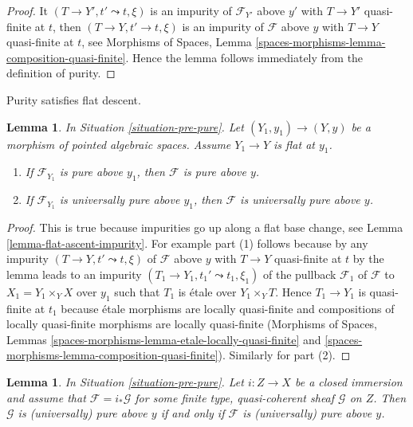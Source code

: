 \documentclass{stacks-project}
\theoremstyle{plain}
\newtheorem{lemma}[subsection]{Lemma}
\theoremstyle{definition}
\theoremstyle{remark}
\numberwithin{equation}{subsection}
\begin{document}
\begin{proof}
It $(T \to Y', t' \leadsto t, \xi)$ is an impurity of
$\mathcal{F}_{Y'}$ above $y'$ with $T \to Y'$ quasi-finite at $t$,
then $(T \to Y, t' \to t, \xi)$ is an impurity of $\mathcal{F}$
above $y$ with $T \to Y$ quasi-finite at $t$, see
Morphisms of Spaces, Lemma
\ref{spaces-morphisms-lemma-composition-quasi-finite}.
Hence the lemma follows immediately from the definition of purity.
\end{proof}

\noindent
Purity satisfies flat descent.

\begin{lemma}
\label{lemma-flat-descend-pure}
In Situation \ref{situation-pre-pure}.
Let $(Y_1, y_1) \to (Y, y)$ be a morphism of pointed algebraic spaces.
Assume $Y_1 \to Y$ is flat at $y_1$.
\begin{enumerate}
\item If $\mathcal{F}_{Y_1}$ is pure above $y_1$,
then $\mathcal{F}$ is pure above $y$.
\item If $\mathcal{F}_{Y_1}$ is universally pure above $y_1$,
then $\mathcal{F}$ is universally pure above $y$.
\end{enumerate}
\end{lemma}

\begin{proof}
This is true because impurities go up along a flat base change, see
Lemma \ref{lemma-flat-ascent-impurity}. For example
part (1) follows because by any impurity $(T \to Y, t' \leadsto t, \xi)$
of $\mathcal{F}$ above $y$ with $T \to Y$ quasi-finite at $t$
by the lemma leads to an impurity
$(T_1 \to Y_1, t_1' \leadsto t_1, \xi_1)$ of the pullback
$\mathcal{F}_1$ of $\mathcal{F}$ to $X_1 = Y_1 \times_Y X$
over $y_1$ such that $T_1$ is \'etale over $Y_1 \times_Y T$.
Hence $T_1 \to Y_1$ is quasi-finite at $t_1$ because
\'etale morphisms are locally quasi-finite and compositions
of locally quasi-finite morphisms are locally quasi-finite
(Morphisms of Spaces, Lemmas
\ref{spaces-morphisms-lemma-etale-locally-quasi-finite} and
\ref{spaces-morphisms-lemma-composition-quasi-finite}).
Similarly for part (2).
\end{proof}

\begin{lemma}
\label{lemma-supported-on-closed}
In Situation \ref{situation-pre-pure}. Let $i : Z \to X$ be a closed immersion
and assume that $\mathcal{F} = i_*\mathcal{G}$ for some
finite type, quasi-coherent sheaf $\mathcal{G}$ on $Z$.
Then $\mathcal{G}$ is (universally) pure above $y$
if and only if $\mathcal{F}$ is (universally) pure above $y$.
\end{lemma}
\end{document}

